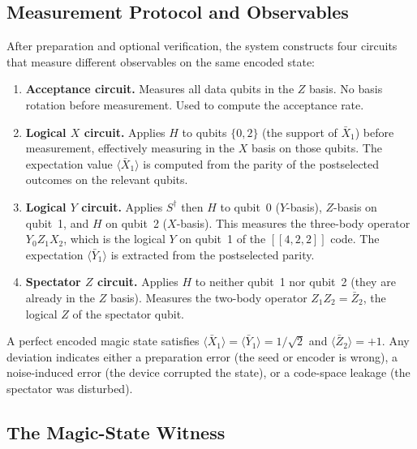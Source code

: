 \documentclass[11pt,a4paper]{article}
\newcommand{\expect}[1]{\langle #1 \rangle}
\begin{document}
\subsection{Measurement Protocol and Observables}
\label{sec:observables}

After preparation and optional verification, the system constructs four
circuits that measure different observables on the same encoded state:

\begin{enumerate}
  \item \textbf{Acceptance circuit.} Measures all data qubits in the $Z$
    basis. No basis rotation before measurement. Used to compute the
    acceptance rate.

  \item \textbf{Logical $X$ circuit.} Applies $H$ to qubits $\{0, 2\}$
    (the support of $\bar{X}_1$) before measurement, effectively measuring
    in the $X$ basis on those qubits. The expectation value
    $\expect{\bar{X}_1}$ is computed from the parity of the postselected
    outcomes on the relevant qubits.

  \item \textbf{Logical $Y$ circuit.} Applies $S^\dagger$ then $H$ to qubit~0
    ($Y$-basis), $Z$-basis on qubit~1, and $H$ on qubit~2 ($X$-basis). This
    measures the three-body operator $Y_0 Z_1 X_2$, which is the logical $Y$
    on qubit~1 of the $[\![4,2,2]\!]$ code. The expectation
    $\expect{\bar{Y}_1}$ is extracted from the postselected parity.

  \item \textbf{Spectator $Z$ circuit.} Applies $H$ to neither qubit~1 nor
    qubit~2 (they are already in the $Z$ basis). Measures the two-body
    operator $Z_1 Z_2 = \bar{Z}_2$, the logical $Z$ of the spectator qubit.
\end{enumerate}

\begin{keyconcept}
A perfect encoded magic state satisfies $\expect{\bar{X}_1} =
\expect{\bar{Y}_1} = 1/\sqrt{2}$ and $\expect{\bar{Z}_2} = +1$. Any
deviation indicates either a preparation error (the seed or encoder is wrong),
a noise-induced error (the device corrupted the state), or a code-space
leakage (the spectator was disturbed).
\end{keyconcept}

\subsection{The Magic-State Witness}
\label{sec:witness}
\end{document}
